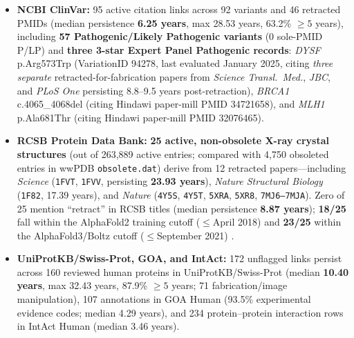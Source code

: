 \documentclass[11pt,letterpaper]{article}
\begin{document}
\begin{itemize}
\item \textbf{NCBI ClinVar:} 95 active citation links across 92 variants and 46 retracted PMIDs (median persistence \textbf{6.25 years}, max 28.53 years, 63.2\% $\ge 5$ years), including \textbf{57 Pathogenic/Likely Pathogenic variants} (0 sole-PMID P/LP) and \textbf{three 3-star Expert Panel Pathogenic records}: \emph{DYSF} p.Arg573Trp (VariationID 94278, last evaluated January 2025, citing \emph{three separate} retracted-for-fabrication papers from \emph{Science Transl.\ Med.}, \emph{JBC}, and \emph{PLoS One} persisting 8.8--9.5 years post-retraction), \emph{BRCA1} c.4065\_4068del (citing Hindawi paper-mill PMID 34721658), and \emph{MLH1} p.Ala681Thr (citing Hindawi paper-mill PMID 32076465).
\item \textbf{RCSB Protein Data Bank:} \textbf{25 active, non-obsolete X-ray crystal structures} (out of 263,889 active entries; compared with 4,750 obsoleted entries in wwPDB \texttt{obsolete.dat}) derive from 12 retracted papers—including \emph{Science} (\texttt{1FVT}, \texttt{1FVV}, persisting \textbf{23.93 years}), \emph{Nature Structural Biology} (\texttt{1F82}, 17.39 years), and \emph{Nature} (\texttt{4Y5S}, \texttt{4Y5T}, \texttt{5XRA}, \texttt{5XR8}, \texttt{7MJ6--7MJA}). Zero of 25 mention ``retract'' in RCSB titles (median persistence \textbf{8.87 years}); \textbf{18/25} fall within the AlphaFold2 training cutoff ($\le$April 2018) \citep{jumper2021_af2} and \textbf{23/25} within the AlphaFold3/Boltz cutoff ($\le$September 2021) \citep{abramson2024_af3_main}.
\item \textbf{UniProtKB/Swiss-Prot, GOA, and IntAct:} 172 unflagged links persist across 160 reviewed human proteins in UniProtKB/Swiss-Prot (median \textbf{10.40 years}, max 32.43 years, 87.9\% $\ge 5$ years; 71 fabrication/image manipulation), 107 annotations in GOA Human (93.5\% experimental evidence codes; median 4.29 years), and 234 protein--protein interaction rows in IntAct Human (median 3.46 years).

\end{itemize}
\end{document}
